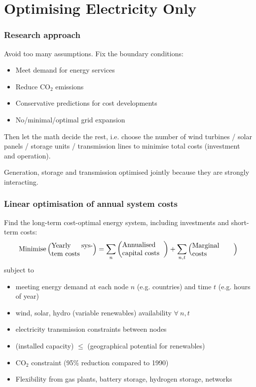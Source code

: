 \documentclass[10pt,aspectratio=169,dvipsnames]{beamer}
\def\co2{CO${}_2$}
\let\olditem\item
\renewcommand{\item}{%
\olditem\vspace{5pt}}
\begin{document}
\section{Optimising Electricity Only}


\begin{frame}
  \frametitle{Research approach}

  Avoid too many assumptions. Fix the \alert{boundary conditions}:

  \begin{itemize}
  \item Meet demand for energy services
  \item Reduce \co2 emissions
  \item Conservative predictions for cost developments
  \item No/minimal/optimal grid expansion
  \end{itemize}

  Then \alert{let the math decide the rest}, i.e. choose the number of
  wind turbines / solar panels / storage units / transmission lines to
  minimise total costs (investment \alert{and} operation).

  \vspace{.3cm}

  Generation, storage and transmission optimised \alert{jointly}
  because they are \alert{strongly interacting}.
\end{frame}



\begin{frame}[fragile]
  \frametitle{Linear optimisation of annual system costs}

Find the long-term cost-optimal energy system, including investments and short-term costs:
\begin{equation*}
  \textrm{Minimise} \left(\parbox{6em}{Yearly system costs}\right) = \sum_n \left(\parbox{6em}{Annualised capital costs}\right) + \sum_{n,t} \left(\parbox{6em}{Marginal costs}\right)
\end{equation*}
subject to
\begin{itemize}
\item meeting energy demand at each node $n$ (e.g. countries) and time $t$ (e.g. hours of year)
\item wind, solar, hydro (variable renewables) availability $\forall\: n,t$
\item electricity transmission constraints between nodes
\item (installed capacity) $\leq$ (geographical potential for renewables)
\item CO${}_2$ constraint (95\% reduction compared to 1990)
\item Flexibility from gas plants, battery storage, hydrogen storage, networks
\end{itemize}

\end{frame}
\end{document}
